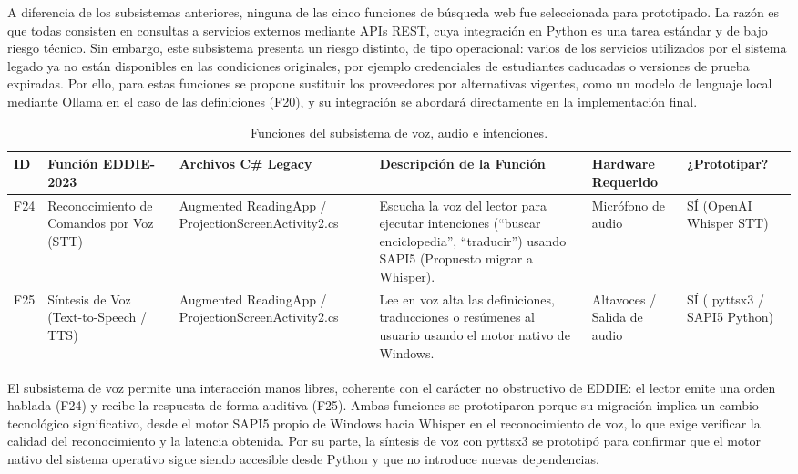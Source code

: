 A diferencia de los subsistemas anteriores, ninguna de las cinco funciones de búsqueda web fue seleccionada para prototipado. La razón es que todas consisten en consultas a servicios externos mediante APIs REST, cuya integración en Python es una tarea estándar y de bajo riesgo técnico. Sin embargo, este subsistema presenta un riesgo distinto, de tipo operacional: varios de los servicios utilizados por el sistema legado ya no están disponibles en las condiciones originales, por ejemplo credenciales de estudiantes caducadas o versiones de prueba expiradas. Por ello, para estas funciones se propone sustituir los proveedores por alternativas vigentes, como un modelo de lenguaje local mediante Ollama en el caso de las definiciones (F20), y su integración se abordará directamente en la implementación final.
 
\begin{table}[H]
    \centering
    \caption{Funciones del subsistema de voz, audio e intenciones.}
    \label{tab:func_voz_audio}
    \begin{small}
    \begin{tabular}{|L{0.6cm}|L{2.2cm}|L{2.2cm}|L{4.1cm}|L{1.6cm}|L{1.8cm}|}
        \hline
        \textbf{ID} & \textbf{Función EDDIE-2023} & \textbf{Archivos C\# Legacy} & \textbf{Descripción de la Función} & \textbf{Hardware Requerido} & \textbf{¿Prototipar?} \\ \hline
        F24 & Reconocimiento de Comandos por Voz (STT) & Augmented ReadingApp / ProjectionScreenActivity2.cs & Escucha la voz del lector para ejecutar intenciones (``buscar enciclopedia'', ``traducir'') usando SAPI5 (Propuesto migrar a Whisper). & Micrófono de audio & SÍ (OpenAI Whisper STT) \\ \hline
        F25 & Síntesis de Voz (Text-to-Speech / TTS) & Augmented ReadingApp / ProjectionScreenActivity2.cs & Lee en voz alta las definiciones, traducciones o resúmenes al usuario usando el motor nativo de Windows. & Altavoces / Salida de audio & SÍ ( pyttsx3 / SAPI5 Python) \\ \hline
    \end{tabular}
    \end{small}
\end{table}
 
El subsistema de voz permite una interacción manos libres, coherente con el carácter no obstructivo de EDDIE: el lector emite una orden hablada (F24) y recibe la respuesta de forma auditiva (F25). Ambas funciones se prototiparon porque su migración implica un cambio tecnológico significativo, desde el motor SAPI5 propio de Windows hacia Whisper en el reconocimiento de voz, lo que exige verificar la calidad del reconocimiento y la latencia obtenida. Por su parte, la síntesis de voz con  pyttsx3 se prototipó para confirmar que el motor nativo del sistema operativo sigue siendo accesible desde Python y que no introduce nuevas dependencias.
 
